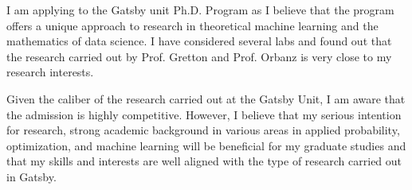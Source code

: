 \documentclass[]{article}
\newcommand{\bx}{\mathbf{x}}
\begin{document}
I am applying to the Gatsby unit Ph.D. Program as I believe that the program offers a unique approach to research in theoretical machine learning and the mathematics of data science. I have considered several labs and found out that the research carried out by  Prof. Gretton and Prof. Orbanz is very close to my research interests.

Given the caliber of the research carried out at the Gatsby Unit, I am aware that the admission is highly competitive. However, I believe that my serious intention for research, strong academic background in various areas in applied probability, optimization, and machine learning will be beneficial for my graduate studies and that my skills and interests are well aligned with the type of research carried out in Gatsby. 








\end{document}
